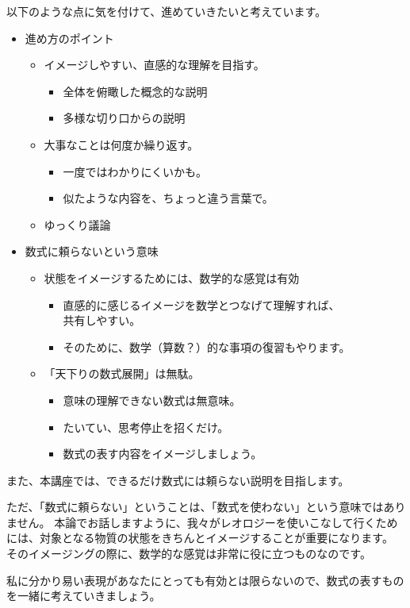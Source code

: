 \documentclass[uplatex,dvipdfmx,a4paper,11pt]{jsreport}
\begin{document}
以下のような点に気を付けて、進めていきたいと考えています。
\begin{boxnote}
	\large
	\begin{itemize}
		\item 進め方のポイント
		\begin{itemize}	
			\item
			  イメージしやすい、直感的な理解を目指す。
			  \begin{itemize}
			  \item
				全体を俯瞰した概念的な説明
			  \item
				多様な切り口からの説明
			  \end{itemize}
			\item
			  大事なことは何度か繰り返す。
			  \begin{itemize}
			  \item
				一度ではわかりにくいかも。
			  \item
				似たような内容を、ちょっと違う言葉で。
			  \end{itemize}
			\item
			  ゆっくり議論
		\end{itemize}
		\item 数式に頼らないという意味
		\begin{itemize}
			\item 状態をイメージするためには、数学的な感覚は有効
				\begin{itemize}
					\item 直感的に感じるイメージを数学とつなげて理解すれば、\\
					共有しやすい。
					\item そのために、数学（算数？）的な事項の復習もやります。
				\end{itemize}
			\item 「天下りの数式展開」は無駄。
				\begin{itemize}
				\item 意味の理解できない数式は無意味。
				\item たいてい、思考停止を招くだけ。
				\item 数式の表す内容をイメージしましょう。
				\end{itemize}
		\end{itemize}
	\end{itemize}
\end{boxnote}

また、本講座では、できるだけ数式には頼らない説明を目指します。

ただ、「数式に頼らない」ということは、「数式を使わない」という意味ではありません。
本論でお話しますように、我々がレオロジーを使いこなして行くためには、対象となる物質の状態をきちんとイメージすることが重要になります。
そのイメージングの際に、数学的な感覚は非常に役に立つものなのです。

私に分かり易い表現があなたにとっても有効とは限らないので、数式の表すものを一緒に考えていきましょう。
\end{document}
